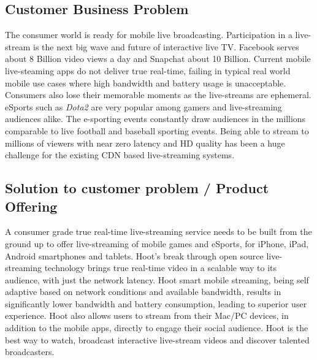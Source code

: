 \documentclass{article}
\begin{document}
\subsection{Customer Business Problem}
The consumer world is ready for mobile live broadcasting. Participation in a live-stream is the next big wave and future of interactive live TV. Facebook serves about 8 Billion video views a day and Snapchat about 10 Billion. Current mobile live-steaming apps do not deliver true real-time, failing in typical real world mobile use cases where high bandwidth and battery usage is unacceptable. Consumers also lose their memorable moments as the live-streams are ephemeral. eSports such as \emph{Dota2} are very popular among gamers and live-streaming audiences alike. The e-sporting events constantly draw audiences in the millions comparable to live football and baseball sporting events. Being able to stream to millions of viewers with near zero latency and HD quality has been a huge challenge for the existing CDN based live-streaming systems.

\subsection{Solution to customer problem / Product Offering}
A consumer grade true real-time live-streaming service needs to be built from the ground up to offer live-streaming of mobile games and eSports, for iPhone, iPad, Android smartphones and tablets. Hoot's break through open source live-streaming technology brings true real-time video in a scalable way to its audience, with just the network latency. Hoot smart mobile streaming, being self adaptive based on network conditions and available bandwidth, results in significantly lower bandwidth and battery consumption, leading to superior user experience. Hoot also allows users to stream from their Mac/PC devices, in addition to the mobile apps, directly to engage their social audience. Hoot is the best way to watch, broadcast interactive live-stream videos and discover talented broadcasters.

%
\end{document}
